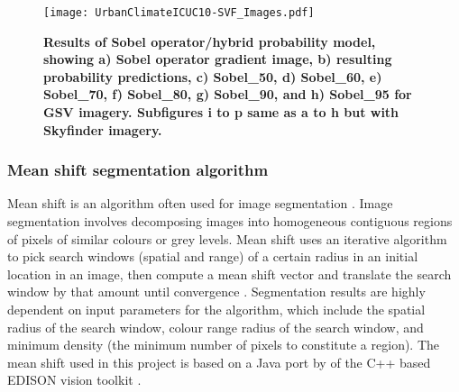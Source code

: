 \documentclass[final,3p,times,authoryear]{elsarticle}
\begin{document}
	

\begin{figure}
\centering    
\texttt{[image: UrbanClimateICUC10-SVF\_Images.pdf]}
\caption{\bf Results of Sobel operator/hybrid probability model, showing a) Sobel operator gradient image, b) resulting probability predictions, c) Sobel\_50, d) Sobel\_60, e) Sobel\_70, f) Sobel\_80, g) Sobel\_90, and h) Sobel\_95 for GSV imagery. Subfigures i to p same as a to h but with Skyfinder imagery.}    
 \label{fig:sobolresults}  
\end{figure} 

\subsubsection{Mean shift segmentation algorithm}\label{sec:mean}

Mean shift is an algorithm often used for image segmentation \citep{Comaniciu1997,Comaniciu2002}. Image segmentation involves decomposing images into homogeneous contiguous regions of pixels of similar colours or grey levels. Mean shift uses an iterative algorithm to pick search windows (spatial and range) of a certain radius in an initial location in an image, then compute a mean shift vector and translate the search window by that amount until convergence \citep{Comaniciu1997}. Segmentation results are highly dependent on input parameters for the algorithm, which include the spatial radius of the search window, colour range radius of the search window, and minimum density (the minimum number of pixels to constitute a region). The mean shift used in this project is based on a Java port by \cite{Pangburn2002} of the C++ based EDISON vision toolkit \citep{Christoudias2002}. 
\end{document}
